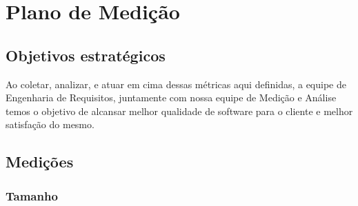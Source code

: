 \chapter{Plano de Medição}

\section{Objetivos estratégicos}

Ao coletar, analizar, e atuar em cima dessas métricas aqui definidas, a equipe de Engenharia de Requisitos, juntamente com nossa equipe de Medição e Análise temos o objetivo de alcansar melhor qualidade de software para o cliente e melhor satisfação do mesmo.

\section{Medições}

\subsection{Tamanho}

